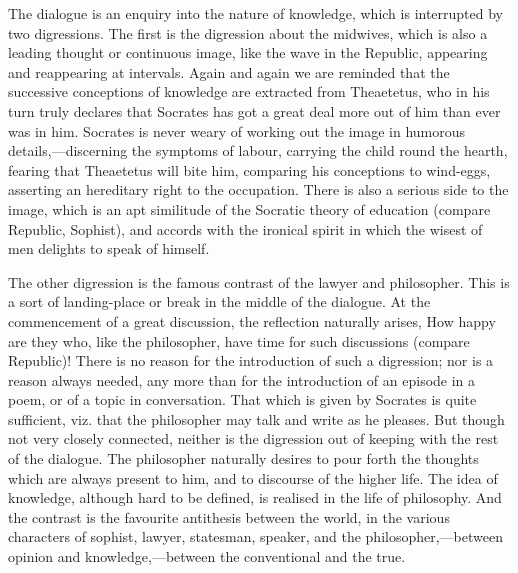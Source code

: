 \documentclass[11pt,letter]{article}
\begin{document}
\par  The dialogue is an enquiry into the nature of knowledge, which is interrupted by two digressions. The first is the digression about the midwives, which is also a leading thought or continuous image, like the wave in the Republic, appearing and reappearing at intervals. Again and again we are reminded that the successive conceptions of knowledge are extracted from Theaetetus, who in his turn truly declares that Socrates has got a great deal more out of him than ever was in him. Socrates is never weary of working out the image in humorous details,—discerning the symptoms of labour, carrying the child round the hearth, fearing that Theaetetus will bite him, comparing his conceptions to wind-eggs, asserting an hereditary right to the occupation. There is also a serious side to the image, which is an apt similitude of the Socratic theory of education (compare Republic, Sophist), and accords with the ironical spirit in which the wisest of men delights to speak of himself.

\par  The other digression is the famous contrast of the lawyer and philosopher. This is a sort of landing-place or break in the middle of the dialogue. At the commencement of a great discussion, the reflection naturally arises, How happy are they who, like the philosopher, have time for such discussions (compare Republic)! There is no reason for the introduction of such a digression; nor is a reason always needed, any more than for the introduction of an episode in a poem, or of a topic in conversation. That which is given by Socrates is quite sufficient, viz. that the philosopher may talk and write as he pleases. But though not very closely connected, neither is the digression out of keeping with the rest of the dialogue. The philosopher naturally desires to pour forth the thoughts which are always present to him, and to discourse of the higher life. The idea of knowledge, although hard to be defined, is realised in the life of philosophy. And the contrast is the favourite antithesis between the world, in the various characters of sophist, lawyer, statesman, speaker, and the philosopher,—between opinion and knowledge,—between the conventional and the true.
\end{document}
